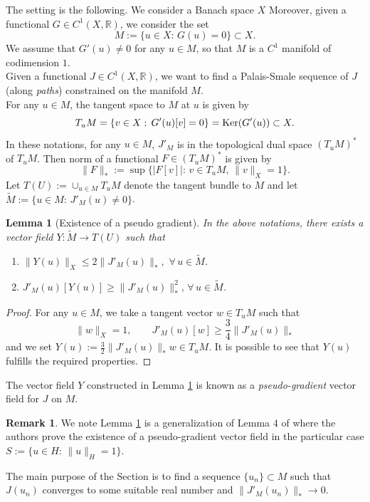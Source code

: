 \documentclass[11pt,reqno]{amsart}
\newtheorem{lemma}[theorem]{Lemma}
\theoremstyle{definition}
\newtheorem{remark}[theorem]{Remark}
\numberwithin{equation}{section}
\numberwithin{theorem}{section}
\numberwithin{equation}{section}
\numberwithin{theorem}{section}
\newcommand{\R}{\mathbb{R}}
\begin{document}
The setting is the following. We consider a Banach space $X$ %
Moreover, given a functional $G\in C^1(X,\R)$, we consider the set
$$M:=\{u\in X:\,G(u)=0\}\subset X.$$
We assume that $G'(u)\ne 0$ for any $u\in M$, so that $M$ is a $C^1$ manifold of codimension $1$.\\


Given a functional $J\in C^1(X,\R)$, we want to find a Palais-Smale sequence of $J$ (along {\em paths}) constrained on the manifold $M$.\\

For any $u\in M$, the tangent space to $M$ at $u$ is given by $$T_u M=\{v\in X:\,G'(u)[v]=0\}={\rm Ker}(G'(u))\subset X.$$
In these notations, for any $u\in M$, $J'_M$ is in the topological dual space $(T_u M)^\ast$ of $T_u M$. Then norm of a functional $F\in (T_u M)^\ast$ is given by
$$\|F\|_\ast:=\sup\{|F[v]|:\,v\in T_u M,\,\|v\|_{X}=1\}.$$
Let $T(U):=\cup_{u\in M}T_u M$ denote the tangent bundle to $M$ and let $\tilde{M}:=\{u\in M:\,J'_M(u)\ne 0\}$.
\begin{lemma}[Existence of a pseudo gradient]
\label{lemma-pseudo-grad}
In the above notations, there exists a vector field $Y:\tilde{M}\to T(U)$ such that
\begin{enumerate}
\item $\|Y(u)\|_X\le 2\|J'_M(u)\|_\ast,\,\,\forall\,u\in \tilde{M}$.
\item $J'_M(u)[Y(u)]\ge\|J'_M(u)\|^2_\ast,\,\forall\,u\in \tilde{M}$.
\end{enumerate}
\end{lemma}
\begin{proof}
For any $u\in M$, we take a tangent vector $w\in T_u M$ such that $$\|w\|_X=1,\qquad J'_M(u)[w]\ge\frac{3}{4}\|J'_M(u)\|_\ast$$ 
and we set $Y(u):=\frac{3}{2}\|J'_M(u)\|_\ast w\in T_u M$. It is possible to see that $Y(u)$ fulfills the required properties.  
\end{proof}
The vector field $Y$ constructed in Lemma \ref{lemma-pseudo-grad} is known as a \textit{pseudo-gradient} vector field for $J$ on $M$.
\begin{remark}
We note Lemma \ref{lemma-pseudo-grad} is a generalization of Lemma $4$ of \cite{lions1983nonlinear} where the authors prove the existence of a pseudo-gradient vector field in the particular case $S:=\{u\in H:\,\|u\|_H=1\}$.
\end{remark}
The main purpose of the Section is to find a sequence $\{u_n\}\subset M$ such that $J(u_n)$ converges to some suitable real number and $\|J'_M(u_n)\|_\ast\to 0$.\\
\end{document}
